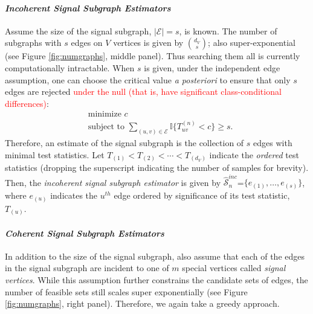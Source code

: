 \documentclass[10pt,journal,cspaper,compsoc]{IEEEtran}
\providecommand{\tr}[1]{\textcolor{red}{#1}}
\newcommand{\II}{\mathbb{I}}           %
\providecommand{\mc}[1]{\mathcal{#1}}
\providecommand{\mhc}[1]{\widehat{\mathcal{#1}}}
\begin{document}
\paragraph{\emph{Incoherent Signal Subgraph Estimators}} %
\label{par:paragraph_name}


Assume the size of the signal subgraph, $|\mc{E}|=s$, is known.  The number of subgraphs with $s$ edges on $V$ vertices is given by $\binom{d_V}{s}$; also super-exponential (see Figure \ref{fig:numgraphs}, middle panel). Thus searching them all is currently computationally intractable.  When $s$ is given, under the  independent edge assumption, one can choose the critical value \emph{a posteriori} to ensure that only $s$ edges are rejected \tr{under the null (that is, have significant class-conditional differences)}:
\begin{align}
	&\text{minimize } c \nonumber \\ &\text{subject to } \sum_{(u,v) \in \mc{E}} \II \{T_{uv}^{(n)} < c\} \geq s.
\end{align}
Therefore, an estimate of the signal subgraph is the collection of $s$ edges with minimal test statistics.  Let $T_{(1)} < T_{(2)} < \cdots < T_{(d_V)}$ indicate the \emph{ordered} test statistics (dropping the superscript indicating the number of samples for brevity).  Then, the \emph{incoherent signal subgraph estimator} is given by $\mhc{S}^{inc}_n$=$\{e_{(1)}, \ldots, e_{(s)}\}$, where $e_{(u)}$ indicates the $u^{th}$ edge ordered by significance of its test statistic, $T_{(u)}$.  %

\paragraph{\emph{Coherent Signal Subgraph Estimators}}

In addition to the size of the signal subgraph, also assume that each of the edges in the signal subgraph are incident to one of $m$ special vertices called \emph{signal vertices}. While this assumption further constrains the candidate sets of edges, the number of feasible sets still scales super exponentially (see Figure \ref{fig:numgraphs}, right panel).  Therefore, we again take a greedy approach.  
\end{document}
